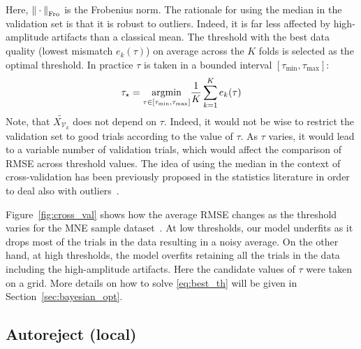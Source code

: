 Here, ${\| \cdot \|}_{\mathrm{Fro}}$ is the Frobenius norm. The rationale for using the median in the validation set is that it is robust to outliers. Indeed, it is far less affected by high-amplitude artifacts than a classical mean. The threshold with the best data quality (lowest mismatch $e_{k}(\tau)$) on average across the $K$ folds is selected as the optimal threshold. In practice $\tau$ is taken in a bounded interval $[\tau_{\min}, \tau_{\max}]$:
%
\begin{equation}
\tau_{\star} = \underset{\tau \in [\tau_{\min}, \tau_{\max}]} {\mathop{\mathrm{argmin}}} \frac{1}{K} \sum_{k=1}^{K}  e_{k}(\tau)
\label{eq:best_th}
\end{equation}
Note, that $\widetilde{X_{\mathcal{V}_k}}$ does not depend on $\tau$. Indeed, it would not be wise to restrict the validation set to good trials according to the value of $\tau$. As $\tau$ varies, it would lead to a variable number of validation trials, which would affect the comparison of RMSE across threshold values. The idea of using the median in the context of cross-validation has been previously proposed in the statistics literature in order to deal also with outliers~\citep{leung2005cross,de2003robust}.

Figure~\ref{fig:cross_val} shows how the average RMSE changes as the threshold varies for the MNE sample dataset~\citep{gramfort2013meg,mne}. At low thresholds, our model underfits as it drops most of the trials in the data resulting in a noisy average. On the other hand, at high thresholds, the model overfits retaining all the trials in the data including the high-amplitude artifacts. Here the candidate values of $\tau$ were taken on a grid. More details on how to solve \eqref{eq:best_th} will be given in Section~\ref{sec:bayesian_opt}.

\subsection{Autoreject (local)}
\label{sec:auto_local}

